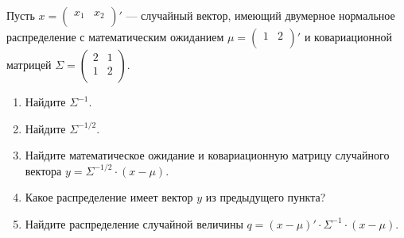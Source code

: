 \begin{problem}
Пусть $x =  \begin{pmatrix}
x_1 & x_2\\
\end{pmatrix} '$ — случайный вектор, имеющий двумерное нормальное распределение с математическим ожиданием $\mu =  \begin{pmatrix}
1 & 2\\
\end{pmatrix} '$ и ковариационной матрицей $\Sigma =
\begin{pmatrix}
2 & 1 \\
1 & 2 \\
\end{pmatrix} $.

\begin{enumerate}
\item Найдите $\Sigma^{-1}$.
\item Найдите $\Sigma^{-1/2}$.
\item Найдите математическое ожидание и ковариационную матрицу случайного вектора $y = \Sigma^{-1/2} \cdot (x - \mu)$.
\item Какое распределение имеет вектор $y$ из предыдущего пункта?
\item Найдите распределение случайной величины $q = (x- \mu)' \cdot \Sigma^{-1} \cdot (x - \mu)$.
\end{enumerate}


\begin{sol}
\end{sol}
\end{problem}



